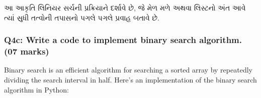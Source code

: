 \begin{Shaded}
\begin{Highlighting}[]
\end{Highlighting}
\end{Shaded}

આ આકૃતિ લિનિયર સર્ચની પ્રક્રિયાને દર્શાવે છે, જે મેળ મળે અથવા લિસ્ટનો અંત આવે ત્યાં સુધી
તત્વોની તપાસનો પગલે પગલે પ્રવાહ બતાવે છે.

\hypertarget{q4c-write-a-code-to-implement-binary-search-algorithm.-07-marks}{%
\subsubsection{Q4c: Write a code to implement binary search algorithm.
(07
marks)}\label{q4c-write-a-code-to-implement-binary-search-algorithm.-07-marks}}

Binary search is an efficient algorithm for searching a sorted array by
repeatedly dividing the search interval in half. Here's an
implementation of the binary search algorithm in Python:

